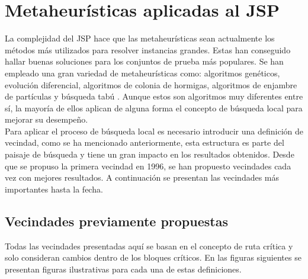 \section{Metaheurísticas aplicadas al JSP}
La complejidad del JSP hace que las metaheurísticas sean actualmente los métodos más utilizados para resolver instancias grandes. Estas han conseguido hallar buenas soluciones para los conjuntos de prueba más populares. Se han empleado una gran variedad de metaheurísticas como: algoritmos genéticos\cite{Cheng1999}, evolución diferencial\cite{Ponsich2013}, algoritmos de colonia de hormigas\cite{Klc2007}, algoritmos de enjambre de partículas\cite{zhang2019novel} y búsqueda tabú \cite{Zhang2007}. Aunque estos son algoritmos muy diferentes entre sí, la mayoría de ellos aplican de alguna forma el concepto de búsqueda local para mejorar su desempeño.\\

Para aplicar el proceso de búsqueda local es necesario introducir una definición de vecindad, como se ha mencionado anteriormente, esta estructura es parte del paisaje de búsqueda y tiene un gran impacto en los resultados obtenidos. Desde que se propuso la primera vecindad en 1996, se han propuesto vecindades cada vez con mejores resultados. A continuación se presentan las vecindades más importantes hasta la fecha. 


\subsection*{Vecindades previamente propuestas}
Todas las vecindades presentadas aquí se basan en el concepto de ruta crítica y solo consideran cambios dentro de los bloques críticos. En las figuras siguientes se presentan figuras ilustrativas para cada una de estas definiciones.

